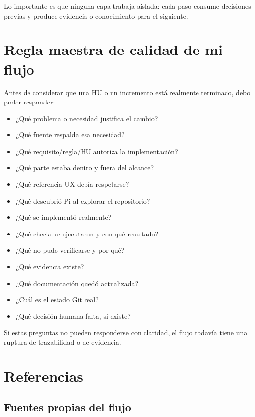 \documentclass[11pt,a4paper]{article}
\begin{document}
Lo importante es que ninguna capa trabaja aislada: cada paso consume decisiones previas y produce evidencia o conocimiento para el siguiente.

\section{Regla maestra de calidad de mi flujo}

Antes de considerar que una HU o un incremento está realmente terminado, debo poder responder:

\begin{itemize}
    \item ¿Qué problema o necesidad justifica el cambio?
    \item ¿Qué fuente respalda esa necesidad?
    \item ¿Qué requisito/regla/HU autoriza la implementación?
    \item ¿Qué parte estaba dentro y fuera del alcance?
    \item ¿Qué referencia UX debía respetarse?
    \item ¿Qué descubrió Pi al explorar el repositorio?
    \item ¿Qué se implementó realmente?
    \item ¿Qué checks se ejecutaron y con qué resultado?
    \item ¿Qué no pudo verificarse y por qué?
    \item ¿Qué evidencia existe?
    \item ¿Qué documentación quedó actualizada?
    \item ¿Cuál es el estado Git real?
    \item ¿Qué decisión humana falta, si existe?
\end{itemize}

Si estas preguntas no pueden responderse con claridad, el flujo todavía tiene una ruptura de trazabilidad o de evidencia.

\section{Referencias}

\subsection*{Fuentes propias del flujo}
\end{document}
